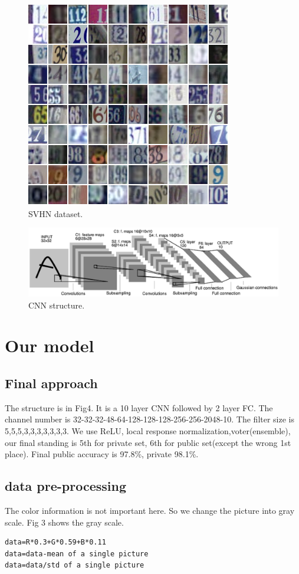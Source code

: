 \documentclass[twocolumn]{webofc}
\begin{document}
\begin{figure}[H]
  \centering
  \includegraphics[width=0.6\columnwidth]{3232.png}
  \caption{SVHN dataset.}
\end{figure}


\begin{figure}[H]
  \centering
  \includegraphics[width=\columnwidth]{cnn.png}
  \caption{CNN structure.}
\end{figure}

\section{Our model}
\subsection{Final approach}
The structure is in Fig4. It is a 10 layer CNN followed by 2 layer FC. The channel number is 32-32-32-48-64-128-128-128-256-256-2048-10. The filter size is 5,5,5,3,3,3,3,3,3,3.
We use ReLU, local response normalization,voter(ensemble), our final standing is 5th for private set, 6th for public set(except the wrong 1st place). Final public accuracy is 97.8\%, private 98.1\%.



\subsection{data pre-processing}
The color information is not important here. So we change the picture into gray scale. Fig 3 shows the gray scale.
\begin{lstlisting}
data=R*0.3+G*0.59+B*0.11
data=data-mean of a single picture
data=data/std of a single picture

\end{lstlisting}
\end{document}
